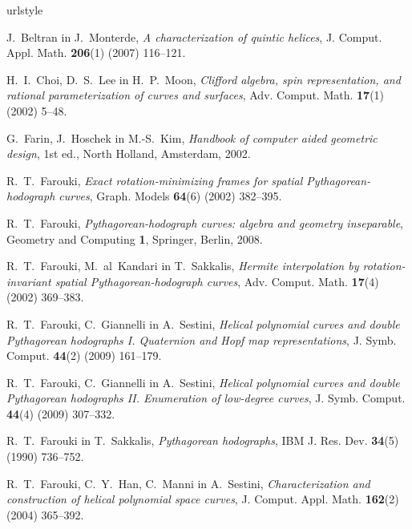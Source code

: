 \documentclass[12pt,a4paper,twoside]{article}
\theoremstyle{definition} %
\theoremstyle{plain} %
\theoremstyle{primerstyle}
\numberwithin{equation}{section}  %
\begin{document}
\begin{thebibliography}{10}
\expandafter\ifx\csname urlstyle\endcsname\relax
  \providecommand{\doi}[1]{doi:\discretionary{}{}{}#1}\else
  \providecommand{\doi}{doi:\discretionary{}{}{}\begingroup
  \urlstyle{rm}\Url}\fi

J.~Beltran in J.~Monterde, \emph{A characterization of quintic helices},
  J. Comput. Appl. Math. \textbf{206}(1) (2007)
  116--121.

H.~I.~Choi, D.~S.~Lee in H.~P.~Moon, \emph{Clifford algebra, spin
  representation, and rational parameterization of curves and surfaces},
  Adv. Comput. Math. \textbf{17}(1) (2002) 5--48.

G.~Farin, J.~Hoschek in M.-S.~Kim, \emph{Handbook of computer aided geometric
  design}, 1st ed., North Holland, Amsterdam, 2002.

R.~T.~Farouki, \emph{Exact rotation-minimizing frames for spatial
  {Pythagorean}-hodograph curves}, Graph. Models \textbf{64}(6) (2002)
  382--395.

R.~T.~Farouki, \emph{Pythagorean-hodograph curves: algebra and geometry inseparable}, Geometry and Computing \textbf{1}, Springer, Berlin, 2008.

R.~T.~Farouki, M.~al~Kandari in T.~Sakkalis, \emph{Hermite interpolation by
  rotation-invariant spatial {Pythagorean}-hodograph curves}, Adv. Comput. Math. \textbf{17}(4) (2002) 369--383.

R.~T.~Farouki, C.~Giannelli in A.~Sestini, \emph{{Helical polynomial curves and
  double Pythagorean hodographs I. Quaternion and Hopf map representations}},
  J. Symb. Comput. \textbf{44}(2) (2009) 161--179.

R.~T.~Farouki, C.~Giannelli in A.~Sestini, \emph{{Helical polynomial curves and
  double Pythagorean hodographs II. Enumeration of low-degree curves}}, J. Symb. Comput. \textbf{44}(4) (2009) 307--332.

R.~T.~Farouki in T.~Sakkalis, \emph{Pythagorean hodographs}, IBM J. Res. Dev. \textbf{34}(5) (1990) 736--752.

R.~T.~Farouki, C.~Y.~Han, C.~Manni in A.~Sestini, \emph{Characterization and construction of helical
  polynomial space curves}, J. Comput. Appl. Math.
  \textbf{162}(2) (2004) 365--392.


\end{thebibliography}
\end{document}
